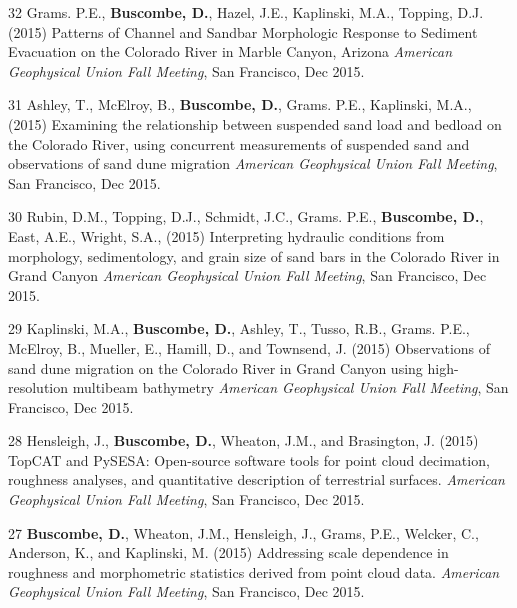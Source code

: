 \documentclass[margin,line]{resume}
\begin{document}
\begin{resume}
\begin{footnotesize}
\begin{list1}
        \item[32] Grams. P.E., {\bf Buscombe, D.}, Hazel, J.E., Kaplinski, M.A., Topping, D.J. (2015) Patterns of Channel and Sandbar Morphologic Response to Sediment Evacuation on the Colorado River in Marble Canyon, Arizona {\sl American Geophysical Union Fall Meeting}, San Francisco, Dec 2015.\\

        \item[31] Ashley, T., McElroy, B., {\bf Buscombe, D.}, Grams. P.E., Kaplinski, M.A., (2015) Examining the relationship between suspended sand load and bedload on the Colorado River, using concurrent measurements of suspended sand and observations of sand dune migration {\sl American Geophysical Union Fall Meeting}, San Francisco, Dec 2015.\\

        \item[30] Rubin, D.M., Topping, D.J., Schmidt, J.C., Grams. P.E., {\bf Buscombe, D.}, East, A.E., Wright, S.A., (2015) Interpreting hydraulic conditions from morphology, sedimentology, and grain size of sand bars in the Colorado River in Grand Canyon {\sl American Geophysical Union Fall Meeting}, San Francisco, Dec 2015.\\
        
        \item[29] Kaplinski, M.A., {\bf Buscombe, D.}, Ashley, T., Tusso, R.B., Grams. P.E., McElroy, B., Mueller, E., Hamill, D., and Townsend, J. (2015) Observations of sand dune migration on the Colorado River in Grand Canyon using high-resolution multibeam bathymetry {\sl American Geophysical Union Fall Meeting}, San Francisco, Dec 2015.\\

        \item[28] Hensleigh, J., {\bf Buscombe, D.}, Wheaton, J.M., and Brasington, J. (2015) TopCAT and PySESA: Open-source software tools for point cloud decimation, roughness analyses, and quantitative description of terrestrial surfaces. {\sl American Geophysical Union Fall Meeting}, San Francisco, Dec 2015.\\  
        
        \item[27] {\bf Buscombe, D.}, Wheaton, J.M., Hensleigh, J., Grams, P.E., Welcker, C., Anderson, K., and Kaplinski, M. (2015) Addressing scale dependence in roughness and morphometric statistics derived from point cloud data. {\sl American Geophysical Union Fall Meeting}, San Francisco, Dec 2015.\\    
        

\end{list1}
\end{footnotesize}
\end{resume}
\end{document}
